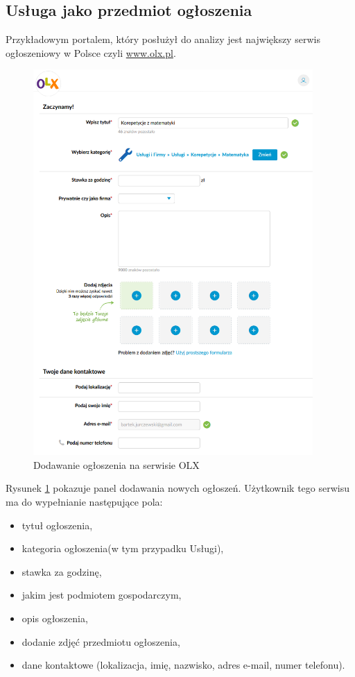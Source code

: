 \documentclass[12pt]{article}
\numberwithin{figure}{section}
\begin{document}
\begin{sloppypar}
\subsection{Usługa jako przedmiot ogłoszenia}
Przykładowym portalem, który posłużył do analizy jest największy serwis ogłoszeniowy w Polsce czyli \url{www.olx.pl}.

    \begin{figure}[!htbp]
    	\centering
    	\includegraphics[width=0.95\textwidth]{images/chapter_2/olx-add-announcement.png}
    	\caption{Dodawanie ogłoszenia na serwisie OLX}
    	\label{fig:olx-add-announcement}
    \end{figure}

Rysunek \ref{fig:olx-add-announcement} pokazuje panel dodawania nowych ogłoszeń. 
Użytkownik tego serwisu ma do wypełnianie następujące pola:
\begin{itemize}
    \item tytuł ogłoszenia,
    \item kategoria ogłoszenia(w tym przypadku Usługi),
    \item stawka za godzinę,
    \item jakim jest podmiotem gospodarczym,
    \item opis ogłoszenia,
    \item dodanie zdjęć przedmiotu ogłoszenia,
    \item dane kontaktowe (lokalizacja, imię, nazwisko, adres e-mail, numer telefonu).
\end{itemize}


\end{sloppypar}
\end{document}
